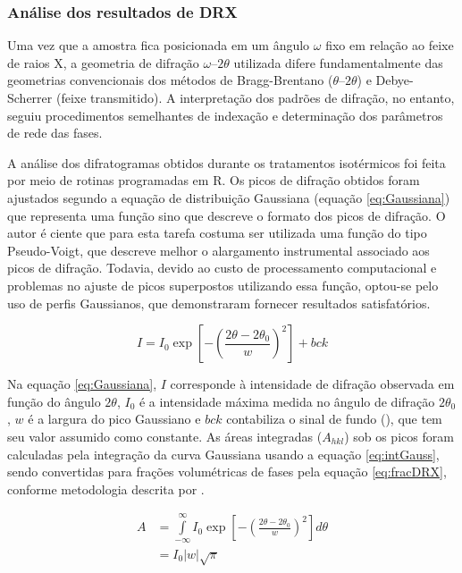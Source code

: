 \subsubsection{Análise dos resultados de DRX}

\label{subsec:analiseDRX}

Uma vez que a amostra fica posicionada em um ângulo $\omega$ fixo em relação ao feixe de raios X, a geometria de difração $\omega$--$2\theta$ utilizada difere fundamentalmente das geometrias convencionais dos métodos de Bragg-Brentano ($\theta$--$2\theta$) e Debye-Scherrer (feixe transmitido). A interpretação dos padrões de difração, no entanto, seguiu procedimentos semelhantes de indexação e determinação dos parâmetros de rede das fases.

A análise dos difratogramas obtidos durante os tratamentos isotérmicos foi feita por meio de rotinas programadas em R. Os picos de difração obtidos foram ajustados segundo a equação de distribuição Gaussiana (equação \ref{eq:Gaussiana}) que representa uma função sino que descreve o formato dos picos de difração. O autor é ciente que para esta tarefa costuma ser utilizada uma função do tipo Pseudo-Voigt, que descreve melhor o alargamento instrumental associado aos picos de difração. Todavia, devido ao custo de processamento computacional e problemas no ajuste de picos superpostos utilizando essa função, optou-se pelo uso de perfis Gaussianos, que demonstraram fornecer resultados satisfatórios.

\begin{equation}
  I = I_0 \exp{\left[-\left(\frac{2\theta - 2\theta_0}{w}\right)^2\right]} + bck
  \label{eq:Gaussiana}
\end{equation}

Na equação \ref{eq:Gaussiana}, $I$ corresponde à intensidade de difração observada em função do ângulo $2\theta$, $I_0$ é a intensidade máxima medida no ângulo de difração $2\theta_0$, $w$ é a largura do pico Gaussiano e $bck$ contabiliza o sinal de fundo (), que tem seu valor assumido como constante. As áreas integradas ($A_{hkl}$) sob os picos foram calculadas pela integração da curva Gaussiana usando a equação \ref{eq:intGauss}, sendo convertidas para frações volumétricas de fases pela equação \ref{eq:fracDRX}, conforme metodologia descrita por .

\begin{align}
  A &= \int\limits_{-\infty}^{\infty} I_0 \exp{\left[-\left(\frac{2\theta - 2\theta_0}{w}\right)^2\right]} d \theta \nonumber \\
  &= I_0 |w| \sqrt{\pi}
  \label{eq:intGauss}
\end{align}

